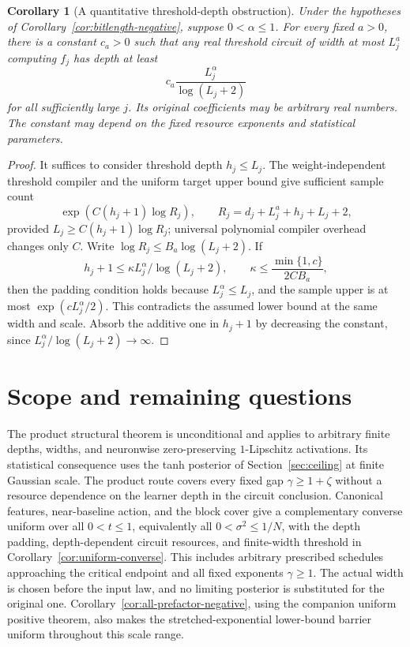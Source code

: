 \documentclass[11pt]{article}
\newtheorem{corollary}[theorem]{Corollary}
\theoremstyle{remark}
\begin{document}
\begin{corollary}[A quantitative threshold-depth obstruction]
\label{cor:quantitative-threshold-depth}
Under the hypotheses of Corollary~\ref{cor:bitlength-negative},
suppose $0<\alpha\le1$. For every fixed $a>0$, there is a constant
$c_a>0$ such that any real threshold circuit of width at most
$L_j^a$ computing $f_j$ has depth at least
\[
 c_a\frac{L_j^\alpha}{\log(L_j+2)}
\]
for all sufficiently large $j$. Its original coefficients may be
arbitrary real numbers. The constant may depend on the fixed
resource exponents and statistical parameters.
\end{corollary}
\begin{proof}
It suffices to consider threshold depth $h_j\le L_j$. The
weight-independent threshold compiler and the uniform target
upper bound give sufficient sample count
\[
 \exp(C(h_j+1)\log R_j),\qquad
 R_j=d_j+L_j^a+h_j+L_j+2,
\]
provided $L_j\ge C(h_j+1)\log R_j$; universal polynomial
compiler overhead changes only $C$. Write
$\log R_j\le B_a\log(L_j+2)$. If
\[
 h_j+1\le\kappa L_j^\alpha/\log(L_j+2),\qquad
 \kappa\le\frac{\min\{1,c\}}{2CB_a},
\]
then the padding condition holds because $L_j^\alpha\le L_j$,
and the sample upper is at most $\exp(cL_j^\alpha/2)$.
This contradicts the assumed lower bound at the same width and
scale. Absorb the additive one in $h_j+1$ by decreasing the
constant, since $L_j^\alpha/\log(L_j+2)\to\infty$.
\end{proof}

\section{Scope and remaining questions}

The product structural theorem is unconditional and applies to arbitrary
finite depths, widths, and neuronwise zero-preserving $1$-Lipschitz
activations. Its statistical consequence uses the tanh posterior of
Section~\ref{sec:ceiling} at finite Gaussian scale. The product route covers every
fixed gap $\gamma\ge1+\zeta$ without a resource dependence on
the learner depth in the circuit conclusion.
Canonical features, near-baseline action, and the block cover
give a complementary converse uniform over all $0<t\le1$,
equivalently all $0<\sigma^2\le1/N$, with the depth padding,
depth-dependent circuit resources, and finite-width threshold
in Corollary~\ref{cor:uniform-converse}.
This includes arbitrary prescribed schedules approaching the
critical endpoint and all fixed exponents $\gamma\ge1$.
The actual width is chosen before the input law, and no limiting
posterior is substituted for the original one.
Corollary~\ref{cor:all-prefactor-negative}, using the companion
uniform positive theorem, also makes the stretched-exponential
lower-bound barrier uniform throughout this scale range.
\end{document}
